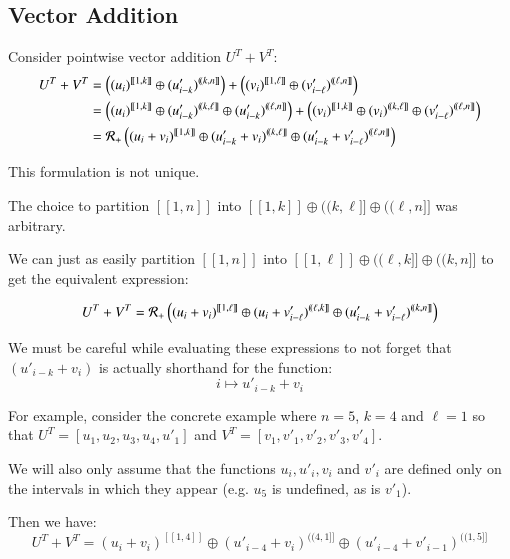 \subsection{Vector Addition}


Consider pointwise vector addition $U^T + V^T$:
\begin{align}
	U^T + V^T 
	&= \left( (u_i)^{[\![1, k]\!]} \oplus (u'_{i-k})^{(\!(k,n]\!]} \right) 
		+
		\left( (v_i)^{[\![1, \ell]\!]} \oplus (v'_{i-\ell})^{(\!(\ell,n]\!]} \right) \\
	&= \left( (u_i)^{[\![1, k]\!]} \oplus (u'_{i-k})^{(\!(k,\ell]\!]} \oplus (u'_{i-k})^{(\!(\ell,n]\!]} \right) 
		+
		\left( (v_i)^{[\![1, k]\!]} \oplus (v_i)^{(\!(k, \ell]\!]} \oplus (v'_{i-\ell})^{(\!(\ell,n]\!]} \right) \\
	&= \R[+] \left( (u_i + v_i)^{[\![1, k]\!]} 
		\oplus (u'_{i-k} + v_i)^{(\!(k,\ell]\!]} 
		\oplus (u'_{i-k}+v'_{i-\ell})^{(\!(\ell,n]\!]} \right)
\end{align}

This formulation is not unique.

The choice to partition $[\![1,n]\!]$ into $[\![1,k]\!] \oplus (\!(k,\ell]\!] \oplus (\!(\ell, n]\!]$ was arbitrary.

We can just as easily partition $[\![1,n]\!]$ into $[\![1,\ell]\!] \oplus (\!(\ell, k]\!] \oplus (\!(k, n]\!]$ to get the equivalent expression:

\begin{equation}
	U^T + V^T = \R[+] \left( (u_i + v_i)^{[\![1, \ell]\!]} 
		\oplus (u_{i} + v'_{i-\ell})^{(\!(\ell,k]\!]} 
		\oplus (u'_{i-k}+v'_{i-\ell})^{(\!(k,n]\!]} \right)
\end{equation}

We must be careful while evaluating these expressions to not forget that $(u'_{i-k} + v_i)$ is actually shorthand for the function:
\begin{equation*}
	i \mapsto u'_{i-k} + v_i
\end{equation*}

For example, consider the concrete example where $n=5$, $k=4$ and $\ell = 1$ so that
$U^T = [ u_1, u_2, u_3, u_4, u'_1 ]$ and
$V^T = [ v_1, v'_1, v'_2, v'_3, v'_4 ]$.

We will also only assume that the functions $u_i, u'_i, v_i$ and $v'_i$ are defined only on the intervals in which they appear (e.g. $u_5$ is undefined, as is $v'_1$).

Then we have:
\begin{equation}
U^T + V^T = (u_i + v_i)^{[\![1,4]\!]} \oplus (u'_{i-4} + v_i)^{(\!(4,1]\!]} \oplus (u'_{i-4} + v'_{i-1})^{(\!(1,5]\!]}
\end{equation}

